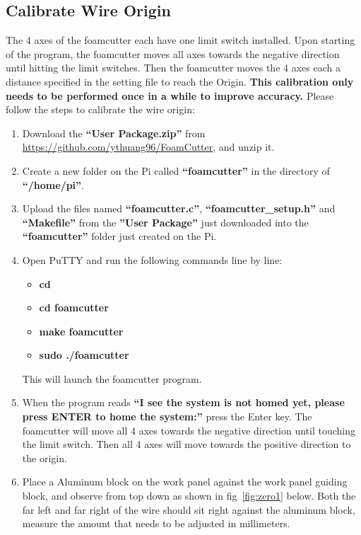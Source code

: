 \documentclass[titlepage,12pt,letter]{report}
\numberwithin{equation}{chapter}
\begin{document}
\subsection{Calibrate Wire Origin}
\label{sec:calibration}
The 4 axes of the foamcutter each have one limit switch installed. Upon starting of the program, the foamcutter moves all axes towards the negative direction until hitting the limit switches. Then the foamcutter moves the 4 axes each a distance specified in the setting file to reach the Origin. \textbf{This calibration only needs to be performed once in a while to improve accuracy.} Please follow the  steps to calibrate the wire origin:

\begin{enumerate}[noitemsep,topsep=0pt]
\item Download the \textbf{``User Package.zip''} from \href{https://github.com/ythuang96/FoamCutter}{https://github.com/ythuang96/FoamCutter}, and unzip it.
\item Create a new folder on the Pi called \textbf{``foamcutter''} in the directory of \textbf{``/home/pi''}. 
\item Upload the files named \textbf{``foamcutter.c''}, \textbf{``foamcutter\_setup.h''} and \textbf{``Makefile''} from the \textbf{''User Package''} just downloaded into the \textbf{``foamcutter''} folder just created on the Pi.
\item Open PuTTY and run the following commands line by line:
\begin{itemize}[noitemsep,topsep=0pt]
	\item \textbf{cd}
	\item \textbf{cd foamcutter}
	\item \textbf{make foamcutter}
	\item \textbf{sudo ./foamcutter}
\end{itemize}
This will launch the foamcutter program.
\item When the program reads \textbf{``I see the system is not homed yet, please press ENTER to home the system:''} press the Enter key. The foamcutter will move all 4 axes towards the negative direction until touching the limit switch. Then all 4 axes will move towards the positive direction to the origin.
\item Place a Aluminum block on the work panel against the work panel guiding block, and observe from top down as shown in fig~\ref{fig:zero1} below. Both the far left and far right of the wire should sit right against the aluminum block, measure the amount that needs to be adjusted in millimeters. 

\end{enumerate}
\end{document}
